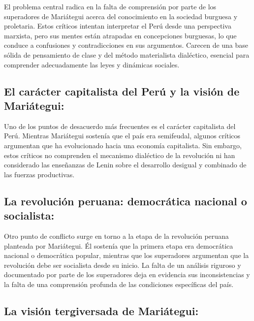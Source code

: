 \documentclass[
  letterpaper,
  DIV=11,
  numbers=noendperiod]{scrartcl}
\begin{document}
El problema central radica en la falta de comprensión por parte de los
superadores de Mariátegui acerca del conocimiento en la sociedad
burguesa y proletaria. Estos críticos intentan interpretar el Perú desde
una perspectiva marxista, pero sus mentes están atrapadas en
concepciones burguesas, lo que conduce a confusiones y contradicciones
en sus argumentos. Carecen de una base sólida de pensamiento de clase y
del método materialista dialéctico, esencial para comprender
adecuadamente las leyes y dinámicas sociales.

\hypertarget{el-caruxe1cter-capitalista-del-peruxfa-y-la-visiuxf3n-de-mariuxe1tegui}{%
\subsection{El carácter capitalista del Perú y la visión de
Mariátegui:}\label{el-caruxe1cter-capitalista-del-peruxfa-y-la-visiuxf3n-de-mariuxe1tegui}}

Uno de los puntos de desacuerdo más frecuentes es el carácter
capitalista del Perú. Mientras Mariátegui sostenía que el país era
semifeudal, algunos críticos argumentan que ha evolucionado hacia una
economía capitalista. Sin embargo, estos críticos no comprenden el
mecanismo dialéctico de la revolución ni han considerado las enseñanzas
de Lenin sobre el desarrollo desigual y combinado de las fuerzas
productivas.

\hypertarget{la-revoluciuxf3n-peruana-democruxe1tica-nacional-o-socialista}{%
\subsection{La revolución peruana: democrática nacional o
socialista:}\label{la-revoluciuxf3n-peruana-democruxe1tica-nacional-o-socialista}}

Otro punto de conflicto surge en torno a la etapa de la revolución
peruana planteada por Mariátegui. Él sostenía que la primera etapa era
democrática nacional o democrática popular, mientras que los superadores
argumentan que la revolución debe ser socialista desde su inicio. La
falta de un análisis riguroso y documentado por parte de los superadores
deja en evidencia sus inconsistencias y la falta de una comprensión
profunda de las condiciones específicas del país.

\hypertarget{la-visiuxf3n-tergiversada-de-mariuxe1tegui}{%
\subsection{La visión tergiversada de
Mariátegui:}\label{la-visiuxf3n-tergiversada-de-mariuxe1tegui}}
\end{document}
